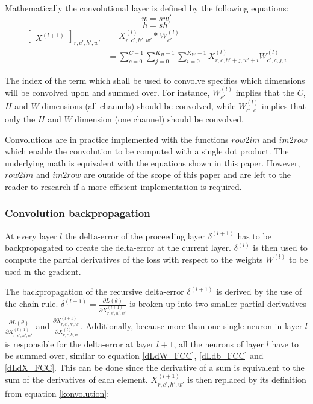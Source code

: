 \documentclass[a4paper,11pt,twoside]{article}
\newcommand*{\inpd}[2]{\ensuremath{\frac{\partial #1}{\partial #2}}}
\begin{document}
Mathematically the convolutional layer is defined by the following equations: \cite{cs231n} \cite{convmath}
\begin{equation}
w = sw'
\end{equation}
\begin{equation}
h = sh'
\end{equation}
\begin{equation}\label{konvolution}
\begin{split}
	\begin{bmatrix} X^{(l+1)} \end{bmatrix}_{r, c', h', w'}	
		& = X^{(l)}_{r, c', h', w'} *W^{(l)}_{c'} \\
		& = \sum^{C-1}_{c=0} \sum^{K_H-1}_{j=0} \sum^{K_W-1}_{i=0} X^{(l)}_{r, c, h'+j, w'+i}W^{(l)}_{c', c, j, i}
\end{split}
\end{equation}

The index of the term which shall be used to convolve specifies which dimensions will be convolved upon and summed over. For instance, $W^{(l)}_{c'}$ implies that the $C$, $H$ and $W$ dimensions (all channels) should be convolved, while $W^{(l)}_{c', c}$ implies that only the $H$ and $W$ dimension (one channel) should be convolved.

Convolutions are in practice implemented with the functions $row2im$ and $im2row$ which enable the convolution to be computed with a single dot product. The underlying math is equivalent with the equations shown in this paper. However, $row2im$ and $im2row$ are outside of the scope of this paper and are left to the reader to research if a more efficient implementation is required. \cite{cs231n} \cite{convmath} \cite{convarithmetic}

\subsubsection{Convolution backpropagation}
At every layer $l$ the delta-error of the proceeding layer $\delta^{(l+1)}$ has to be backpropagated to create the delta-error at the current layer. $\delta^{(l)}$ is then used to compute the partial derivatives of the loss with respect to the weights $W^{(l)}$ to be used in the gradient.

The backpropagation of the recursive delta-error $\delta^{(l+1)}$ is derived by the use of the chain rule. $\delta^{(l+1)} = \inpd{L(\theta)}{X^{(l+1)}_{r,c',h',w'}}$ is broken up into two smaller partial derivatives $\inpd{L(\theta)}{X^{(l+1)}_{r,c',h',w'}}$ and $\inpd{X^{(l+1)}_{r,c',h',w'}}{X^{(l)}_{r,c,h,w}}$. Additionally, because more than one single neuron in layer $l$ is responsible for the delta-error at layer $l+1$, all the neurons of layer $l$ have to be summed over, similar to equation \eqref{dLdW_FCC}, \eqref{dLdb_FCC} and \eqref{dLdX_FCC}. This can be done since the derivative of a sum is equivalent to the sum of the derivatives of each element. $X^{(l+1)}_{r,c',h',w'}$ is then replaced by its definition from equation \eqref{konvolution}: \cite{convmath} \cite{webconv1} \cite{webconv2} \cite{webconv3}
\end{document}
